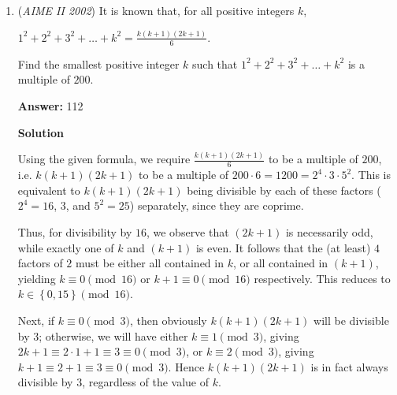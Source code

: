 \begin{enumerate}
Using partial fraction decomposition, we determine that
 \[\frac{1}{x^2-4} = \frac{1}{4}\left(\frac{1}{x-2}-\frac{1}{x+2}\right)\]Therefore,
 \[1000\sum_{n=3}^{10000}\frac1{n^2-4}=1000\cdot \frac{1}{4}\sum_{n=3}^{10000}\left(\frac{1}{x-2}-\frac{1}{x+2}\right)\]The denominators of the positive terms are $1,2,..,9998$ while the denominators of the negative terms are $5,6,...,10002$. Hence, the summation telescopes, leaving us with
 \[1000\cdot \frac{1}{4}\left(1 + \frac{1}{2} + \frac{1}{3} + \frac{1}{4} - \frac{1}{9999} - \frac{1}{10000} - \frac{1}{10001} - \frac{1}{10002}\right)\]First, ignore the final four terms. The sum then becomes
 \[1000\cdot \frac{1}{4}\left(1+\frac{1}{2}+\frac{1}{3}+\frac{1}{4}\right)=1000\cdot \frac{25}{48}=1000\cdot 0.5208\ldots\approx 520.8\]Next, consider the final four terms. We know that
 \[1000\cdot \frac{1}{4}\left(\frac{1}{9999} + \frac{1}{10000} + \frac{1}{10001} + \frac{1}{10002}\right)\approx 250\cdot \frac{4}{10000}=0.1\]But decreasing $520.8$ by $0.1$ would not change its nearest integer, hence the answer is $\boxed{521}$.

 


	\item (\textit{AIME II 2002}) It is known that, for all positive integers $k$,


 $1^2+2^2+3^2+\ldots+k^{2}=\frac{k(k+1)(2k+1)}6$.

 Find the smallest positive integer $k$ such that $1^2+2^2+3^2+\ldots+k^2$ is a multiple of $200$.


 
 \textbf{Answer: }112



\textbf{Solution}

Using the given formula, we require $\frac{k(k+1)(2k+1)}{6}$ to be a multiple of $200$, i.e. $k(k+1)(2k+1)$ to be a multiple of $200 \cdot 6 = 1200 = 2^4 \cdot 3 \cdot 5^2$. This is equivalent to $k(k+1)(2k+1)$ being divisible by each of these factors ($2^4 = 16$, $3$, and $5^2 = 25$) separately, since they are coprime.

 Thus, for divisibility by $16$, we observe that $(2k+1)$ is necessarily odd, while exactly one of $k$ and $(k+1)$ is even. It follows that the (at least) $4$ factors of $2$ must be either all contained in $k$, or all contained in $(k+1)$, yielding $k \equiv 0 \pmod{16}$ or $k+1 \equiv 0 \pmod{16}$ respectively. This reduces to $k \in \left\{0,15\right\} \pmod{16}$.

 Next, if $k \equiv 0 \pmod{3}$, then obviously $k(k+1)(2k+1)$ will be divisible by 3; otherwise, we will have either $k \equiv 1 \pmod{3}$, giving $2k+1 \equiv 2 \cdot 1 + 1 \equiv 3 \equiv 0 \pmod{3}$, or $k \equiv 2 \pmod{3}$, giving $k+1 \equiv 2+1 \equiv 3 \equiv 0 \pmod{3}$. Hence $k(k+1)(2k+1)$ is in fact always divisible by $3$, regardless of the value of $k$.


\end{enumerate}
